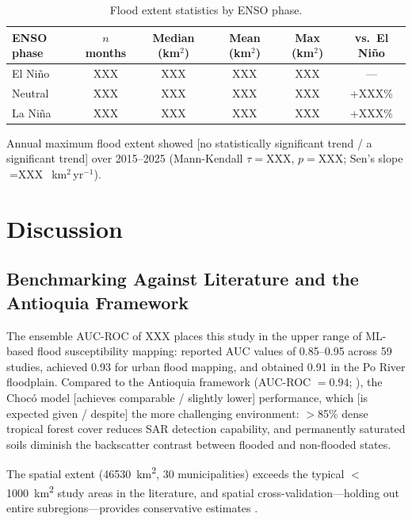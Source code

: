 \documentclass{article}
\begin{document}
\begin{table}[htbp]
\caption{Flood extent statistics by ENSO phase.}
\label{tab:enso}
\centering
\footnotesize
\begin{tabular}{lccccc}
\toprule
\textbf{ENSO phase} & \textbf{$n$ months} & \textbf{Median (km$^2$)} & \textbf{Mean (km$^2$)} & \textbf{Max (km$^2$)} & \textbf{vs.\ El Ni\~no} \\
\midrule
El Ni\~no  & XXX & XXX & XXX & XXX & --- \\
Neutral    & XXX & XXX & XXX & XXX & +XXX\% \\
La Ni\~na  & XXX & XXX & XXX & XXX & +XXX\% \\
\bottomrule
\end{tabular}
\end{table}

Annual maximum flood extent showed [no statistically significant trend / a significant trend] over 2015--2025 (Mann-Kendall $\tau = \text{XXX}$, $p = \text{XXX}$; Sen's slope $= \text{XXX}$~km$^2$\,yr$^{-1}$).

\section{Discussion}
\label{sec:discussion}

\subsection{Benchmarking Against Literature and the Antioquia Framework}

The ensemble AUC-ROC of XXX places this study in the upper range of ML-based flood susceptibility mapping: \citet{Mosavi2018} reported AUC values of 0.85--0.95 across 59 studies, \citet{Darabi2021} achieved 0.93 for urban flood mapping, and \citet{Magnini2022} obtained 0.91 in the Po River floodplain. Compared to the Antioquia framework (AUC-ROC $= 0.94$; \citealp{EspinalMaya2026}), the Choc\'o model [achieves comparable / slightly lower] performance, which [is expected given / despite] the more challenging environment: $>$85\% dense tropical forest cover reduces SAR detection capability, and permanently saturated soils diminish the backscatter contrast between flooded and non-flooded states.

The spatial extent (\SI{46530}{\kilo\metre\squared}, 30 municipalities) exceeds the typical $<$\SI{1000}{\kilo\metre\squared} study areas in the literature, and spatial cross-validation---holding out entire subregions---provides conservative estimates \citep{Roberts2017}.
\end{document}
